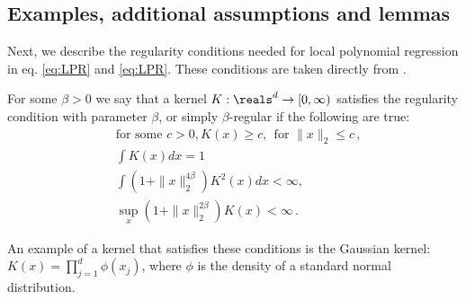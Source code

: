 \subsection{Examples, additional assumptions and lemmas}

Next, we describe the regularity conditions needed for local polynomial regression in eq. \eqref{eq:LPR} and \eqref{eq:LPR}. These conditions are taken directly from \citet[Section 3]{audibert2007Fast}. 
\begin{definition}
\label{def:kernel-reg}
    For some $\beta > 0$ we say that a kernel $K:\reals^d \to [0, \infty)$ satisfies the regularity condition with parameter $\beta$, or simply $\beta$-regular if the following are true: 
    \[
    \begin{aligned}
        & \text{for some } c> 0, K(x)\ge c, ~~ \text{for } \|x\|_2 \le c\,,\\
        & \textstyle \int K(x)dx = 1\\
        & \textstyle\int (1 + \|x\|_2^{4\beta}) K^2(x)dx < \infty, \\
        & \textstyle\sup\limits_{x} (1 + \|x\|_2^{2\beta}) K(x) < \infty\,. 
    \end{aligned}
    \]
\end{definition}
An example of a kernel that satisfies these conditions is the Gaussian kernel: $K(x) = \prod_{j = 1}^d \phi(x_j)$, where $\phi$ is the density of a standard normal distribution. 



